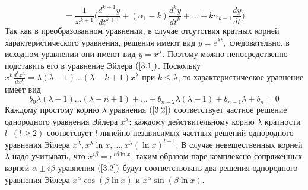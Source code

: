     \begin{equation}
= \frac{1}{x^{k+1}} \Big(\frac{d^{k+1} y}{dt^{k+1}}+(\alpha_1 - k) \frac{d^k y}{dt^k} + \dots + k \alpha_{k-1} \frac{dy}{dt}\Big)
\end{equation}
Так как в преобразованном уравнении, в случае отсутствия
кратных корней характеристического уравнения, решения имеют
вид $y=e^{\lambda t},$ следовательно, в исходном уравнении они имеют вид $y=x^\lambda$. Поэтому можно непосредственно подставить его в уравнение Эйлера $(\ref{3.1})$. Поскольку $x^k\frac{d^kx^\lambda}{dx^k}=\lambda(\lambda-1)\dots(\lambda-k+1)x^\lambda$ при $k\leqslant\lambda$, то характеристическое уравнение имеет вид \begin{equation}
\tag{3.2}
\label{3.2}
    b_0\lambda(\lambda-1)\dots(\lambda-n+1)+\dots+b_{n-2}\lambda(\lambda-1)+b_{n-1}\lambda+b_n=0
\end{equation}
Каждому простому корню $\lambda$ уравнения $(\ref{3.2})$ соответствует частное решение однородного уравнения Эйлера $x^\lambda$; каждому действительному корню $\lambda$ кратности $l\;\;(l\geqslant2)$ соответсвует $l$ линейно
независимых частных решений однородного уравнения Эйлера $x^\lambda, x^\lambda\ln{x}, \dots, x^\lambda(\ln{x})^{l-1}$. В случае невещественных корней $\lambda$ надо
учитывать, что $x^{i\beta}=e^{i\beta\ln{x}}$, таким образом паре комплексно сопряженных
корней $\alpha\pm i\beta$ уравнения $(\ref{3.2})$ будут соответствовать два решения
однородного уравнения Эйлера $x^\alpha\cos{(\beta\ln x)}$ и $x^\alpha\sin{(\beta\ln{x})}$.
